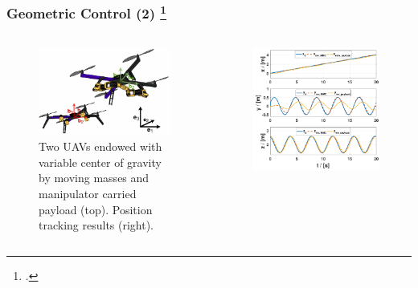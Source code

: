 \begin{frame}
	\frametitle{Geometric Control (2) \footcite{Markovic2019}}
	
	\begin{columns}
		\begin{column}{0.5\textwidth}\centering
			\begin{figure}[H]
				\includegraphics[width=0.8\columnwidth]{figures/uav.png}	
				\centering
				\caption{Two UAVs endowed with variable center of gravity by moving masses and manipulator carried payload (top). Position tracking results (right). }
				\label{fig:uav_model}
			\end{figure}
		\end{column}
		
		\begin{column}{0.5\textwidth}\centering
			\begin{figure}
				\centering
				\includegraphics[width=0.95\columnwidth]{figures/both_pos_crop.pdf}
				\label{fig:traj_pos}
			\end{figure}
		\end{column}
	\end{columns}
\end{frame}

